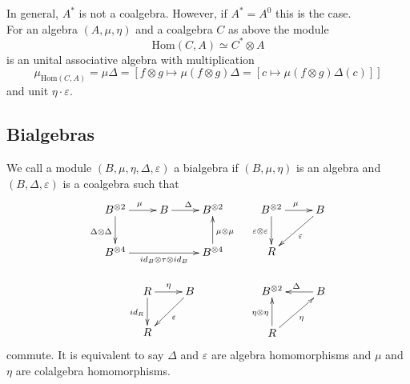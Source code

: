 \documentclass[10pt,a4paper]{article}
\newcommand{\eps}{\varepsilon}
\newcommand{\bao}[1]{\begin{array}{#1}}
\newcommand{\ea}{\end{array}}
\begin{document}
In general, $A^\ast$ is not a coalgebra. However, if $A^\ast = A^0$ this is the case.\\%
\indent For an algebra $(A, \mu, \eta)$ and a coalgebra $C$ as above the module
$$\mathrm{Hom}(C, A) \simeq C^\ast \otimes A$$
is an unital associative algebra with multiplication 
$$\mu_{\mathrm{Hom}(C,A)} = \mu \Delta = \left[f \otimes g \longmapsto \mu(f \otimes g) \Delta = \left[c \longmapsto \mu(f \otimes g) \Delta(c)\right]\right]$$
and unit $\eta \cdot \eps$.
\subsection{Bialgebras}
We call a module $(B, \mu, \eta, \Delta, \eps)$ a bialgebra if $(B, \mu, \eta)$ is an algebra and $(B, \Delta, \eps)$ is a coalgebra such that 
$$\begin{array}{cc}
\xymatrix{
B^{\otimes2} \ar[d]_{\Delta \otimes \Delta}\ar[r]^{\mu} & B \ar[r]^\Delta & B^{\otimes2}\\
B^{\otimes4} \ar[rr]_{id_B \otimes \tau \otimes id_B}&&B^{\otimes4} \ar[u]_{\mu \otimes \mu}\\
} & \xymatrix{
 B^{\otimes2} \ar[d]_{\eps \otimes \eps}\ar[r]^\mu & B\ar[ld]^{\eps}\\
 R
}\\
&\\
\xymatrix{
R \ar[d]_{id_R}\ar[r]^\eta & B\ar[ld]^\eps\\
R&\\
}
&\xymatrix{
B^{\otimes2} & B\ar[l]_{\Delta}\\
 R\ar[u]^{\eta \otimes \eta} \ar[ur]_{\eta}
}
\end{array}$$
commute. It is equivalent to say $\Delta$ and $\eps$ are algebra homomorphisms and $\mu$ and $\eta$ are colalgebra homomorphisms.
\newpage
\end{document}
